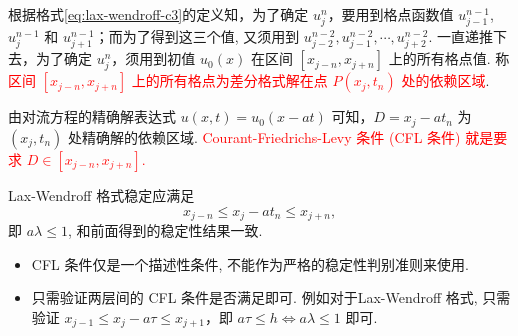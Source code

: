 \begin{center}
\end{center}

根据格式\eqref{eq:lax-wendroff-c3}的定义知，为了确定 $u_j^n$，要用到格点函数值 $u_{j-1}^{n-1}$, $u_j^{n-1}$ 和 $u_{j+1}^{n-1}$；而为了得到这三个值, 又须用到 $u_{j-2}^{n-2}, u_{j-1}^{n-2}, \cdots, u_{j+2}^{n-2}$. 一直递推下去，为了确定 $u_j^n$，须用到初值 $u_0(x)$ 在区间 $[x_{j-n}, x_{j+n}]$ 上的所有格点值. 称\textcolor{red}{区间 $[x_{j-n}, x_{j+n}]$ 上的所有格点为差分格式解在点 $P(x_j, t_n)$ 处的依赖区域}.

由对流方程的精确解表达式 $u(x, t) = u_0(x - at)$ 可知，$D = x_j - at_n$ 为 $(x_j, t_n)$ 处精确解的依赖区域. \textcolor{red}{Courant-Friedrichs-Levy 条件 (CFL 条件) 就是要求 $D \in [x_{j-n}, x_{j+n}]$.}

Lax-Wendroff 格式稳定应满足
\begin{equation}\label{eq:CFL-variable}
    x_{j-n} \leq x_j - at_n \leq x_{j+n},
\end{equation}
即 $a\lambda \leq 1$, 和前面得到的稳定性结果一致.

\begin{note}
    \begin{itemize}
    \item CFL 条件仅是一个描述性条件, 不能作为严格的稳定性判别准则来使用.
    \item 只需验证两层间的 CFL 条件是否满足即可.
    例如对于Lax-Wendroff 格式, 只需验证 $x_{j-1} \leq x_j - a\tau \leq x_{j+1}$，即 $a\tau\leq h \Leftrightarrow a\lambda \leq 1$ 即可.
\end{itemize}
\end{note}


